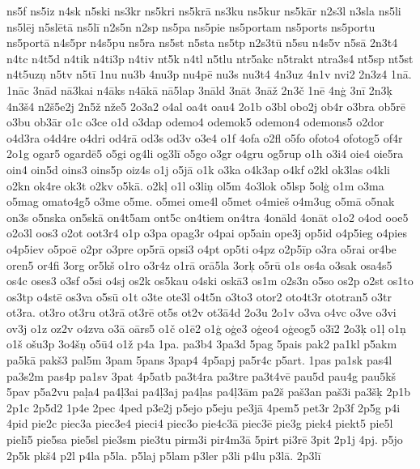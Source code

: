 {{ns5f ns5iz n4sk n5ski ns3kr ns5kri ns5kr\={a} ns3ku ns5kur ns5k\={a}r
n2s3l n3sla ns5li ns5l\={e}j n5sl\={e}t\={a} ns5l\={i} n2s5n
n2sp ns5pa ns5pie ns5portam ns5ports ns5portu ns5port\={a} n4s5pr
n4s5pu ns5ra ns5st n5sta ns5tp n2s3t\={u} n5su n4s5v n5s\={a} 2n3t4
n4tc n4t5d n4tik n4ti3p n4tiv nt5k n4tl n5tlu ntr5akc n5trakt ntra3s4
nt5sp nt5st n4t5uz\c{n} n5tv n5t\={i} 1nu nu3b 4nu3p nu4p\={e}
nu3s nu3t4 4n3uz 4n1v nvi2 2n3z4 1n\={a}. 1n\={a}c 3n\={a}d
n\={a}3kai n4\={a}ks n4\={a}k\={a} n\={a}5lap 3n\={a}ld 3n\={a}t
3n\={a}\v{z} 2n3\v{c} 1n\={e} 4n\c{g} 3n\={i} 2n3\c{k} 4n3\v{s}4
n2\v{s}5e2j 2n5\v{z} n\v{z}e5 2o3a2 o4al oa4t oau4 2o1b o3bl
obo2j ob4r o3bra ob5r\={e} o3bu ob3\={a}r o1c o3ce o1d o3dap odemo4
odemok5 odemon4 odemons5 o2dor o4d3ra o4d4re o4dri od4r\={a} od3s
od3v o3e4 o1f 4ofa o2fl o5fo ofoto4 ofotog5 of4r 2o1g ogar5 ogard\={e}5
o5gi og4li og3l\={i} o5go o3gr o4gru og5rup o1h o3i4 oie4 oie5ra
oin4 oin5d oins3 oins5p oiz4s o1j o5j\={a} o1k o3ka o4k3ap o4kf o2kl
ok3las o4kli o2kn ok4re ok3t o2kv o5k\={a}. o2k\c{l} o1l o3li\c{n}
ol5m 4o3lok o5lsp 5ol\c{g} o1m o3ma o5mag omato4g5 o3me o5me.
o5mei ome4l o5met o4mie\v{s} o4m3ug o5m\={a} o5nak on3s o5nska on5sk\={a}
on4t5am ont5c on4tiem on4tra 4on\={a}ld 4on\={a}t o1o2 o4od
ooe5 o2o3l oos3 o2ot oot3r4 o1p o3pa opag3r o4pai op5ain ope3j op5id
o4p5ieg o4pies o4p5iev o5po\={e} o2pr o3pre op5r\={a} opsi3 o4pt
op5ti o4pz o2p5\={i}p o3ra o5rai or4be oren5 or4fi 3org or5k\v{s}
o1ro o3r4z o1r\={a} or\={a}5la 3or\c{k} o5r\={u} o1s os4a o3sak
osa4s5 os4c oses3 o3sf o5si o4sj os2k os5kau o4ski osk\={a}3 os1m
o2s3n o5so os2p o2st os1to os3tp o4st\={e} os3va o5s\={u} o1t o3te
ote3l o4t5n o3to3 otor2 oto4t3r ototran5 o3tr ot3ra. ot3ro ot3ru ot3r\={a}
ot3r\={e} ot5s ot2v ot3\={a}4d 2o3u 2o1v o3va o4vc o3ve o3vi
ov3j o1z oz2v o4zva o3\={a} o\={a}rs5 o1\v{c} o1\={e}2 o1\c{g} o\c{g}e3
o\c{g}eo4 o\c{g}eog5 o3\={i}2 2o3\c{k} o1\c{l} o1\c{n} o1\v{s}
o\v{s}u3p 3o4\v{s}\c{n} o5\={u}4 o1\v{z} p4a 1pa. pa3b4 3pa3d
5pag 5pais pak2 pa1kl p5akm pa5k\={a} pak\v{s}3 pal5m 3pam 5pans
3pap4 4p5apj pa5r4c p5art. 1pas pa1sk pas4l pa3s2m pas4p pa1sv 3pat
4p5atb pa3t4ra pa3tre pa3t4v\={e} pau5d pau4g pau5k\v{s} 5pav p5a2vu
pa\c{l}a4 pa4\c{l}3ai pa4\c{l}3aj pa4\c{l}as pa4\c{l}3\={a}m
pa2\v{s} pa\v{s}3an pa\v{s}3i pa3\v{s}\c{k} 2p1b 2p1c
2p5d2 1p4e 2pec 4ped p3e2j p5ejo p5eju pe3j\={a} 4pem5 pet3r 2p3f 2p5g
p4i 4pid pie2c piec3a piec3e4 pieci4 piec3o pie4c3\={a} piec3\={e}
pie3g piek4 piekt5 pie5l piel\={i}5 pie5sa pie5sl pie3sm pie3tu
pirm3i pir4m3\={a} 5pirt pi3r\={e} 3pit 2p1j 4pj. p5jo 2p5k pk\v{s}4
p2l p4la p5la. p5laj p5lam p3ler p3li p4lu p3l\={a}. 2p3l\={i}
}}
